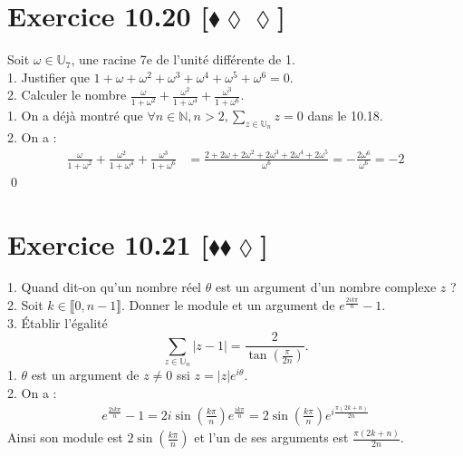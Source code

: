 \documentclass[10pt]{article}
\begin{document}

\section*{Exercice 10.20 [$\blacklozenge\lozenge\lozenge$]}
\begin{tcolorbox}[enhanced, width=7in, center, size=fbox, fontupper=\large, drop shadow southwest]
    Soit $\omega\in\mathbb{U}_7$, une racine 7e de l'unité différente de 1.\\
    1. Justifier que $1+\omega+\omega^2+\omega^3+\omega^4+\omega^5+\omega^6=0$.\\
    2. Calculer le nombre $\frac{\omega}{1+\omega^2} + \frac{\omega^2}{1+\omega^4} + \frac{\omega^3}{1+\omega^6}$.\\[0.2cm]
    1. On a déjà montré que $\forall{n\in\mathbb{N}},n>2,\sum\limits_{z\in\mathbb{U}_n}z=0$ dans le 10.18.\\
    2. On a :
    \begin{align*}
        \frac{\omega}{1+\omega^2} + \frac{\omega^2}{1+\omega^4} + \frac{\omega^3}{1+\omega^6} &=
        \frac{2+2\omega+2\omega^2+2\omega^3+2\omega^4+2\omega^5}{\omega^6}=-\frac{2\omega^6}{\omega^6}=-2
    \end{align*}
    \qed
\end{tcolorbox}


\section*{Exercice 10.21 [$\blacklozenge\blacklozenge\lozenge$]}
\begin{tcolorbox}[enhanced, width=7in, center, size=fbox, fontupper=\large, drop shadow southwest]
    1. Quand dit-on qu'un nombre réel $\theta$ est un argument d'un nombre complexe $z$ ?\\
    2. Soit $k\in\llbracket0,n-1\rrbracket$. Donner le module et un argument de $e^{\frac{2ik\pi}{n}}-1$.\\
    3. Établir l'égalité
    \begin{equation*}
        \sum_{z\in\mathbb{U}_n}{|z-1|}=\frac{2}{\tan\left( \frac{\pi}{2n} \right)}.
    \end{equation*}
    1. $\theta$ est un argument de $z\neq0$ ssi $z=|z|e^{i\theta}$.\\
    2. On a :
    \begin{align*}
        e^{\frac{2ik\pi}{n}}-1=2i\sin\left( \frac{k\pi}{n} \right)e^{\frac{ik\pi}{n}}=2\sin\left( \frac{k\pi}{n} \right)e^{i\frac{\pi(2k+n)}{2n}}
    \end{align*}
    Ainsi son module est $2\sin\left( \frac{k\pi}{n} \right)$ et l'un de ses arguments est $\frac{\pi(2k+n)}{2n}$.
\end{tcolorbox}

\end{document}
